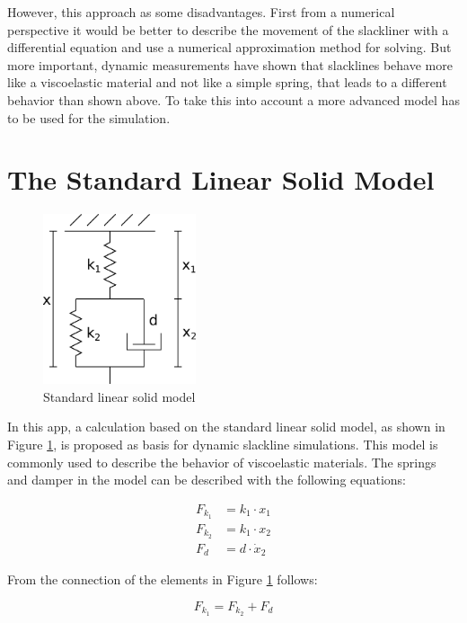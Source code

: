 However, this approach as some disadvantages. First from a numerical perspective it would be better to describe the movement of the slackliner with a differential equation and use a numerical approximation method for solving. But more important, dynamic measurements have shown that slacklines behave more like a viscoelastic material and not like a simple spring, that leads to a different behavior than shown above. To take this into account a more advanced model has to be used for the simulation.

\section{The Standard Linear Solid Model}

\begin{figure}[htb] \centering
	\includegraphics[width=0.4\textwidth]{images/dynamicStandardModel.pdf}
	\caption{Standard linear solid model}
	\label{fig:dynamicStandardModel}
\end{figure}

In this app, a calculation based on the standard linear solid model, as shown in Figure \ref{fig:dynamicStandardModel}, is proposed as basis for dynamic slackline simulations. This model is commonly used to describe the behavior of viscoelastic materials. The springs and damper in the model can be described with the following equations:

\begin{align}
F_{k_1} &= k_1 \cdot x_1 \\
F_{k_2} &= k_1 \cdot x_2 \\
F_{d} &= d \cdot \dot x_2
\end{align}

From the connection of the elements in Figure \ref{fig:dynamicStandardModel} follows:

\begin{equation}
	F_{k_1} = F_{k_2} + F_d
\end{equation}

